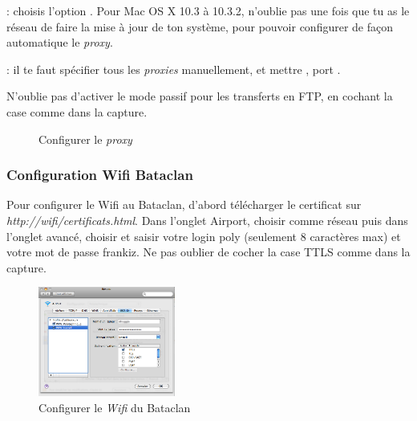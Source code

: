  :  choisis l'option . Pour Mac OS X 10.3 à 10.3.2, n'oublie pas une fois que tu as le réseau de faire la mise à jour de ton système, pour pouvoir configurer de façon automatique le \emph{proxy}.

 : il te faut spécifier tous les
\emph{proxies} manuellement, et mettre , port .


N'oublie pas d'activer le mode passif pour les transferts en FTP, en cochant la case comme dans la capture.


  \begin{figure}[!hl]
    \begin{center}
      \caption{Configurer le \emph{proxy}}
    \end{center}
  \end{figure}
  

\subsubsection{Configuration Wifi Bataclan}
Pour configurer le Wifi au Bataclan, d'abord télécharger le certificat sur \emph{http://wifi/certificats.html}.
Dans l'onglet Airport, choisir comme réseau  puis dans l'onglet avancé, choisir  et saisir votre login poly (seulement 8 caractères max) et votre mot de passe frankiz. Ne pas oublier de cocher la case TTLS comme dans la capture.

\begin{figure}[!hl]
    \begin{center}
      \includegraphics[width=0.4\textwidth]{images/mac_config_wifi.png} 
      \caption{Configurer le \emph{Wifi} du Bataclan}
    \end{center}
  \end{figure}

